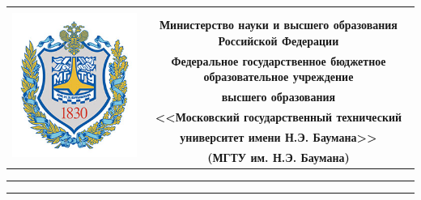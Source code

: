 \documentclass[a4paper,14pt]{article}
\begin{document}
\begin{titlepage}

    \begin{table}
        \centering
        \footnotesize
        \begin{tabular}{cc}
            \multirow{8}{*}{\includegraphics[scale=0.35]{bmstu.jpg}}
             &                                                                           \\
             &                                                                           \\
             & \textbf{Министерство науки и высшего образования Российской Федерации}    \\
             & \textbf{Федеральное государственное бюджетное образовательное учреждение} \\
             & \textbf{высшего образования}                                              \\
             & \textbf{<<Московский государственный технический}                         \\
             & \textbf{университет имени Н.Э. Баумана>>}                                 \\
             & \textbf{(МГТУ им. Н.Э. Баумана)}                                          \\
        \end{tabular}
    \end{table}

    \vspace{-2.5cm}

    \begin{flushleft}
        \rule[-1cm]{\textwidth}{3pt}
        \rule{\textwidth}{1pt}
    \end{flushleft}


\end{titlepage}
\end{document}
